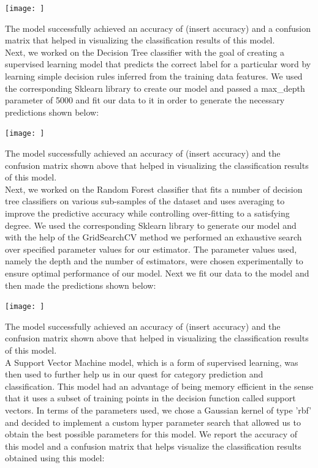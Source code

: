 \documentclass[10pt,twocolumn,letterpaper]{article}
\begin{document}
\begin{center}
\texttt{[image: ]}
\end{center}

The model successfully achieved an accuracy of (insert accuracy) and a confusion matrix that helped in visualizing the classification results of this model.\\ 

Next, we worked on the Decision Tree classifier with the goal of creating a supervised learning model that predicts the correct label for a particular word by learning simple decision rules inferred from the training data features. We used the corresponding Sklearn library to create our model and passed a max\_depth parameter of 5000 and fit our data to it in order to generate the necessary predictions shown below: 

\begin{center}
\texttt{[image: ]}
\end{center}

The model successfully achieved an accuracy of (insert accuracy) and the confusion matrix shown above that helped in visualizing the classification results of this model.\\ 

Next, we worked on the Random Forest classifier that fits a number of decision tree classifiers on various sub-samples of the dataset and uses averaging to improve the predictive accuracy while controlling over-fitting to a satisfying degree. We used the corresponding Sklearn library to generate our model and with the help of the GridSearchCV method we performed an exhaustive search over specified parameter values for our estimator. The parameter values used, namely the depth and the number of estimators, were chosen experimentally to ensure optimal performance of our model. Next we fit our data to the model and then made the predictions shown below:

\begin{center}
\texttt{[image: ]}
\end{center}

The model successfully achieved an accuracy of (insert accuracy) and the confusion matrix shown above that helped in visualizing the classification results of this model.\\ 

A Support Vector Machine model, which is a form of supervised learning, was then used to further help us in our quest for category prediction and classification. This model had an advantage of being memory efficient in the sense that it uses a subset of training points in the decision function called support vectors. In terms of the parameters used, we chose a Gaussian kernel of type 'rbf' and decided to implement a custom hyper parameter search that allowed us to obtain the best possible parameters for this model. We report the accuracy of this model and a confusion matrix that helps visualize the classification results obtained using this model: 
\end{document}
